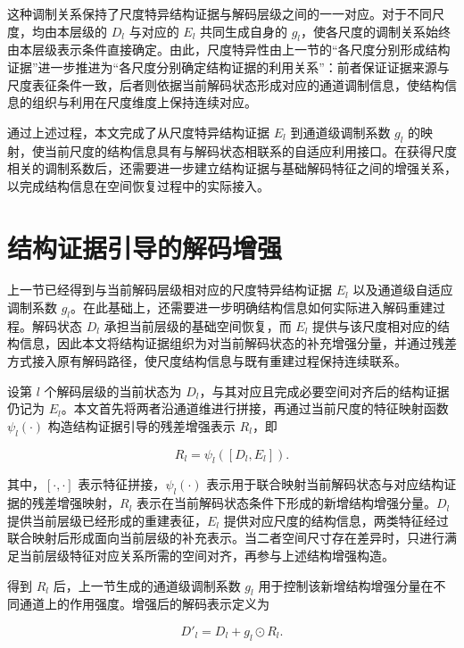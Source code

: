 这种调制关系保持了尺度特异结构证据与解码层级之间的一一对应。对于不同尺度，均由本层级的 \(D_l\) 与对应的 \(E_l\) 共同生成自身的 \(g_l\)，使各尺度的调制关系始终由本层级表示条件直接确定。由此，尺度特异性由上一节的“各尺度分别形成结构证据”进一步推进为“各尺度分别确定结构证据的利用关系”：前者保证证据来源与尺度表征条件一致，后者则依据当前解码状态形成对应的通道调制信息，使结构信息的组织与利用在尺度维度上保持连续对应。

通过上述过程，本文完成了从尺度特异结构证据 \(E_l\) 到通道级调制系数 \(g_l\) 的映射，使当前尺度的结构信息具有与解码状态相联系的自适应利用接口。在获得尺度相关的调制系数后，还需要进一步建立结构证据与基础解码特征之间的增强关系，以完成结构信息在空间恢复过程中的实际接入。

\section{结构证据引导的解码增强}

上一节已经得到与当前解码层级相对应的尺度特异结构证据 \(E_l\) 以及通道级自适应调制系数 \(g_l\)。在此基础上，还需要进一步明确结构信息如何实际进入解码重建过程。解码状态 \(D_l\) 承担当前层级的基础空间恢复，而 \(E_l\) 提供与该尺度相对应的结构信息，因此本文将结构证据组织为对当前解码状态的补充增强分量，并通过残差方式接入原有解码路径，使尺度结构信息与既有重建过程保持连续联系。

设第 \(l\) 个解码层级的当前状态为 \(D_l\)，与其对应且完成必要空间对齐后的结构证据仍记为 \(E_l\)。本文首先将两者沿通道维进行拼接，再通过当前尺度的特征映射函数 \(\psi_l(\cdot)\) 构造结构证据引导的残差增强表示 \(R_l\)，即

\begin{equation}\label{eq:ch4-structure-guided-residual}
R_l=\psi_l\!\left([D_l,E_l]\right).
\end{equation}

其中，\([\cdot,\cdot]\) 表示特征拼接，\(\psi_l(\cdot)\) 表示用于联合映射当前解码状态与对应结构证据的残差增强映射，\(R_l\) 表示在当前解码状态条件下形成的新增结构增强分量。\(D_l\) 提供当前层级已经形成的重建表征，\(E_l\) 提供对应尺度的结构信息，两类特征经过联合映射后形成面向当前层级的补充表示。当二者空间尺寸存在差异时，只进行满足当前层级特征对应关系所需的空间对齐，再参与上述结构增强构造。

得到 \(R_l\) 后，上一节生成的通道级调制系数 \(g_l\) 用于控制该新增结构增强分量在不同通道上的作用强度。增强后的解码表示定义为

\begin{equation}\label{eq:ch4-structure-guided-decoder-enhancement}
D'_l=D_l+g_l\odot R_l.
\end{equation}

